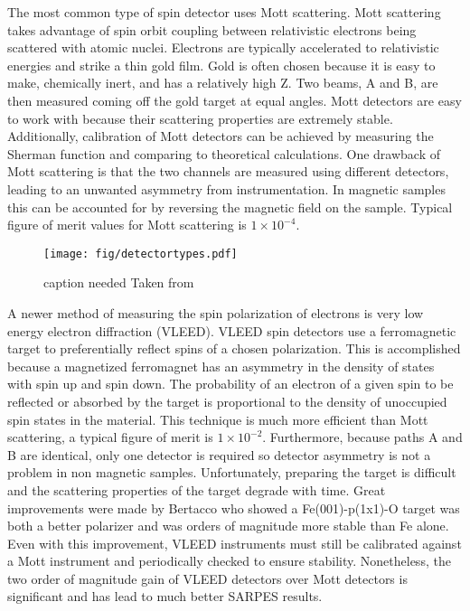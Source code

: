 \documentclass[12pt]{article}
\begin{document}
The most common type of spin detector uses Mott scattering.
Mott scattering takes advantage of spin orbit coupling between relativistic electrons being scattered with atomic nuclei.
Electrons are typically accelerated to relativistic energies and strike a thin gold film.
Gold is often chosen because it is easy to make, chemically inert, and has a relatively high Z.
Two beams, A and B, are then measured coming off the gold target at equal angles\cite{Hoesch}.
Mott detectors are easy to work with because their scattering properties are extremely stable.
Additionally, calibration of Mott detectors can be achieved by measuring the Sherman function and comparing to theoretical calculations.
One drawback of Mott scattering is that the two channels are measured using different detectors, leading to an unwanted asymmetry from instrumentation\cite{Okuda-Kimura}.
In magnetic samples this can be accounted for by reversing the magnetic field on the sample.
Typical figure of merit values for Mott scattering is $1\times10^{-4}$.

\begin{figure}[h]
  \centering
  \texttt{[image: fig/detectortypes.pdf]}
  \caption[should I put this here?]
  {caption needed Taken from \cite{Okuda-Kimura}}
  \label{fig:asymmetry}
\end{figure}

A newer method of measuring the spin polarization of electrons is very low energy electron diffraction (VLEED).
VLEED spin detectors use a ferromagnetic target to preferentially reflect spins of a chosen polarization.
This is accomplished because a magnetized ferromagnet has an asymmetry in the density of states with spin up and spin down.
The probability of an electron of a given spin to be reflected or absorbed by the target is proportional to the density of unoccupied spin states in the material\cite{Okuda-Kimura}.
This technique is much more efficient than Mott scattering, a typical figure of merit is $1\times10^{-2}$.
Furthermore, because paths A and B are identical, only one detector is required so detector asymmetry is not a problem in non magnetic samples.
Unfortunately, preparing the target is difficult and the scattering properties of the target degrade with time.
Great improvements were made by Bertacco \cite{Bertacco} who showed a Fe(001)-p(1x1)-O target was both a better polarizer and was orders of magnitude more stable than Fe alone.
Even with this improvement, VLEED instruments must still be calibrated against a Mott instrument and periodically checked to ensure stability.
Nonetheless, the two order of magnitude gain of VLEED detectors over Mott detectors is significant and has lead to much better SARPES results.
\end{document}
